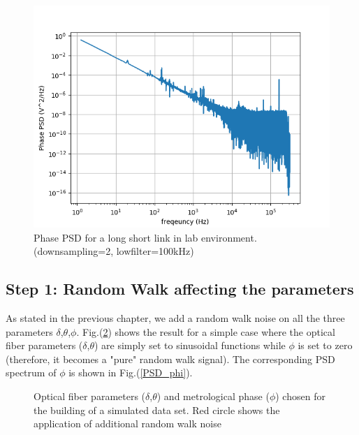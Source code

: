\documentclass[ fontsize=11pt]{scrartcl} %
\numberwithin{equation}{section} %
\numberwithin{figure}{section} %
\numberwithin{table}{section} %
\begin{document}
\begin{figure}[hbtp]
\centering
\includegraphics[scale=0.75]{immagini_noise/noise_short.png}
\caption{Phase PSD for a long short link in lab environment. (downsampling=2, lowfilter=100kHz)}
\label{psd_short}
\end{figure}

\pagebreak

\subsection{Step 1: Random Walk affecting the parameters}

As stated in the previous chapter, we add a random walk noise on all the three parameters $\delta$,$\theta$,$\phi$. Fig.(\ref{randwalk_par}) shows the result for a simple case where the optical fiber parameters ($\delta$,$\theta$) are simply set to sinusoidal functions while $\phi$ is set to zero (therefore, it becomes a "pure" random walk signal). The corresponding PSD spectrum of $\phi$ is shown in Fig.(\ref{PSD_phi}).
\begin{center}
\begin{figure}[hbtp]
\caption{Optical fiber parameters ($\delta$,$\theta$) and metrological phase ($\phi$) chosen for the building of a simulated data set. Red circle shows the application of additional random walk noise}
\label{randwalk_par}
\end{figure}
\end{center}
\end{document}
